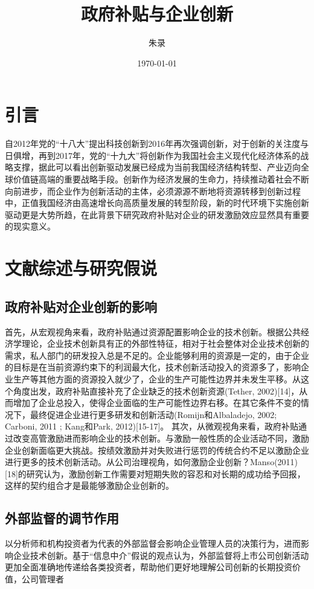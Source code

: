 \documentclass[UTF8]{ctexart} %
\title{政府补贴与企业创新}
\author{朱录}
\date{\today}
\begin{document}
\maketitle
\tableofcontents
\section{引言}
自2012年党的“十八大”提出科技创新到2016年再次强调创新，对于创新的关注度与日俱增，再到2017年，党的“十九大”将创新作为我国社会主义现代化经济体系的战略支撑，据此可以看出创新驱动发展已经成为当前我国经济结构转型、产业迈向全球价值链高端的重要战略手段。创新作为经济发展的生命力，持续推动着社会不断向前进步，而企业作为创新活动的主体，必须源源不断地将资源转移到创新过程中，正值我国经济由高速增长向高质量发展的转型阶段，新的时代环境下实施创新驱动更是大势所趋，在此背景下研究政府补贴对企业的研发激励效应显然具有重要的现实意义。
\section{文献综述与研究假说}
\subsection{政府补贴对企业创新的影响}
首先，从宏观视角来看，政府补贴通过资源配置影响企业的技术创新。根据公共经济学理论，企业技术创新具有正的外部性特征，相对于社会整体对企业技术创新的需求，私人部门的研发投入总是不足的。企业能够利用的资源是一定的，由于企业的目标是在当前资源约束下的利润最大化，技术创新活动投入的资源多了，影响企业生产等其他方面的资源投入就少了，企业的生产可能性边界并未发生平移。从这个角度出发，政府补贴直接补充了企业缺乏的技术创新资源(Tether, 2002)[14]，从而增加了企业总投入，使得企业面临的生产可能性边界右移。在其它条件不变的情况下，最终促进企业进行更多研发和创新活动(Romijn和Albaladejo, 2002; Carboni, 2011 ; Kang和Park, 2012)[15-17]。
其次，从微观视角来看，政府补贴通过改变高管激励进而影响企业的技术创新。与激励一般性质的企业活动不同，激励企业创新面临更大挑战。按绩效激励并对失败进行惩罚的传统合约不足以激励企业进行更多的技术创新活动。从公司治理视角，如何激励企业创新？Manso(2011)[18]的研究认为，激励创新工作需要对短期失败的容忍和对长期的成功给予回报，这样的契约组合才是最能够激励企业创新的。
\subsection{外部监督的调节作用}
以分析师和机构投资者为代表的外部监督会影响企业管理人员的决策行为，进而影响企业技术创新。基于“信息中介”假说的观点认为，外部监督将上市公司创新活动更加全面准确地传递给各类投资者，帮助他们更好地理解公司创新的长期投资价值，公司管理者
\end{document}
